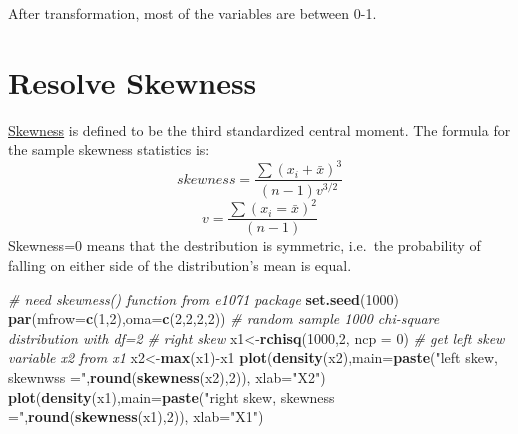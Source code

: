 \documentclass[]{book}
\newenvironment{Shaded}{\begin{snugshade}}{\end{snugshade}}
\newcommand{\KeywordTok}[1]{\textcolor[rgb]{0.13,0.29,0.53}{\textbf{{#1}}}}
\newcommand{\DataTypeTok}[1]{\textcolor[rgb]{0.13,0.29,0.53}{{#1}}}
\newcommand{\DecValTok}[1]{\textcolor[rgb]{0.00,0.00,0.81}{{#1}}}
\newcommand{\StringTok}[1]{\textcolor[rgb]{0.31,0.60,0.02}{{#1}}}
\newcommand{\CommentTok}[1]{\textcolor[rgb]{0.56,0.35,0.01}{\textit{{#1}}}}
\newcommand{\NormalTok}[1]{{#1}}
\theoremstyle{definition}
\theoremstyle{definition}
\theoremstyle{remark}
\begin{document}
After transformation, most of the variables are between 0-1.

\section{Resolve Skewness}\label{resolve-skewness}

\href{https://en.wikipedia.org/wiki/Skewness}{Skewness} is defined to be
the third standardized central moment. The formula for the sample
skewness statistics is:
\[ skewness=\frac{\sum(x_{i}+\bar{x})^{3}}{(n-1)v^{3/2}}\]
\[v=\frac{\sum(x_{i}=\bar{x})^{2}}{(n-1)}\] Skewness=0 means that the
destribution is symmetric, i.e.~the probability of falling on either
side of the distribution's mean is equal.

\begin{Shaded}
\begin{Highlighting}[]
\CommentTok{# need skewness() function from e1071 package}
\KeywordTok{set.seed}\NormalTok{(}\DecValTok{1000}\NormalTok{)}
\KeywordTok{par}\NormalTok{(}\DataTypeTok{mfrow=}\KeywordTok{c}\NormalTok{(}\DecValTok{1}\NormalTok{,}\DecValTok{2}\NormalTok{),}\DataTypeTok{oma=}\KeywordTok{c}\NormalTok{(}\DecValTok{2}\NormalTok{,}\DecValTok{2}\NormalTok{,}\DecValTok{2}\NormalTok{,}\DecValTok{2}\NormalTok{))}
\CommentTok{# random sample 1000 chi-square distribution with df=2}
\CommentTok{# right skew}
\NormalTok{x1<-}\KeywordTok{rchisq}\NormalTok{(}\DecValTok{1000}\NormalTok{,}\DecValTok{2}\NormalTok{, }\DataTypeTok{ncp =} \DecValTok{0}\NormalTok{)}
\CommentTok{# get left skew variable x2 from x1}
\NormalTok{x2<-}\KeywordTok{max}\NormalTok{(x1)-x1}
\KeywordTok{plot}\NormalTok{(}\KeywordTok{density}\NormalTok{(x2),}\DataTypeTok{main=}\KeywordTok{paste}\NormalTok{(}\StringTok{"left skew, skewnwss ="}\NormalTok{,}\KeywordTok{round}\NormalTok{(}\KeywordTok{skewness}\NormalTok{(x2),}\DecValTok{2}\NormalTok{)), }\DataTypeTok{xlab=}\StringTok{"X2"}\NormalTok{)}
\KeywordTok{plot}\NormalTok{(}\KeywordTok{density}\NormalTok{(x1),}\DataTypeTok{main=}\KeywordTok{paste}\NormalTok{(}\StringTok{"right skew, skewness ="}\NormalTok{,}\KeywordTok{round}\NormalTok{(}\KeywordTok{skewness}\NormalTok{(x1),}\DecValTok{2}\NormalTok{)), }\DataTypeTok{xlab=}\StringTok{"X1"}\NormalTok{)}
\end{Highlighting}
\end{Shaded}
\end{document}
